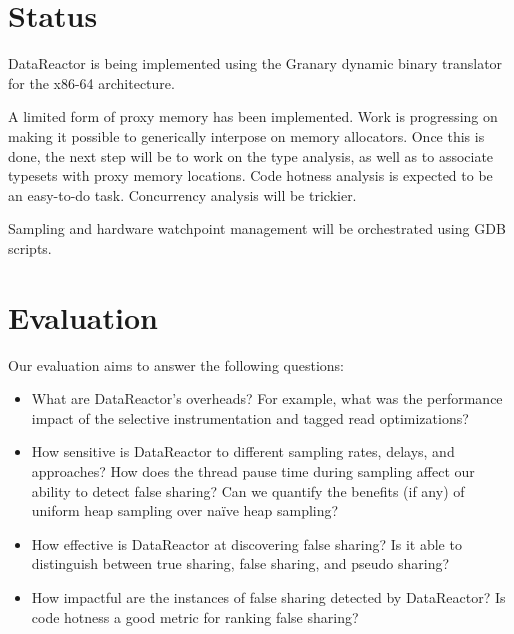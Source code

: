 \documentclass{sig-alternate}
\newcommand{\Toolname}{DataReactor}
\begin{document}
\section{Status}\label{sec:status}
\Toolname{} is being implemented using the Granary dynamic binary translator \cite{Granary} for the x86-64 architecture.

A limited form of proxy memory has been implemented. Work is progressing on making it possible to generically interpose
on memory allocators. Once this is done, the next step will be to work on the type analysis, as well as to associate typesets
with proxy memory locations. Code hotness analysis is expected to be an easy-to-do task. Concurrency analysis will be trickier.

Sampling and hardware watchpoint management will be orchestrated using GDB scripts.


\section{Evaluation}\label{sec:evaluation}
Our evaluation aims to answer the following questions:
\begin{itemize}
\item What are \Toolname{}'s overheads? For example, what was the performance impact of the selective instrumentation
and tagged read optimizations?

\item How sensitive is \Toolname{} to different sampling rates, delays, and approaches? How does the thread
pause time during sampling affect our ability to detect false sharing? Can we quantify the benefits (if any) of
uniform heap sampling over na{\"i}ve heap sampling?

\item How effective is \Toolname{} at discovering false sharing? Is it able to distinguish between true sharing, false sharing,
and pseudo sharing?

\item How impactful are the instances of false sharing detected by \Toolname{}? Is code hotness a good metric for ranking
false sharing?
\end{itemize}
\end{document}
